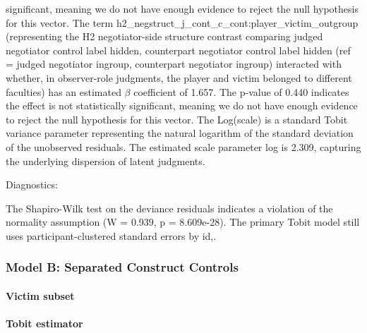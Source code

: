 \documentclass[11pt]{article}
\begin{document}
significant, meaning we do not have enough evidence to reject the null hypothesis for this vector. The term h2\_negstruct\_j\_cont\_c\_cont:player\_victim\_outgroup (representing the H2 negotiator-side structure contrast comparing judged negotiator control label hidden, counterpart negotiator control label hidden (ref = judged negotiator ingroup, counterpart negotiator ingroup) interacted with whether, in observer-role judgments, the player and victim belonged to different faculties) has an estimated $\beta$ coefficient of 1.657. The p-value of 0.440 indicates the effect is not statistically significant, meaning we do not have enough evidence to reject the null hypothesis for this vector. The Log(scale) is a standard Tobit variance parameter representing the natural logarithm of the standard deviation of the unobserved residuals. The estimated scale parameter log is 2.309, capturing the underlying dispersion of latent judgments.

Diagnostics:

The Shapiro-Wilk test on the deviance residuals indicates a violation of the normality assumption (W = 0.939, p = 8.609e-28). The primary Tobit model still uses participant-clustered standard errors by id,.


\subsubsection{Model B: Separated Construct Controls}
\paragraph{Victim subset}

\paragraph{Tobit estimator}
\end{document}
